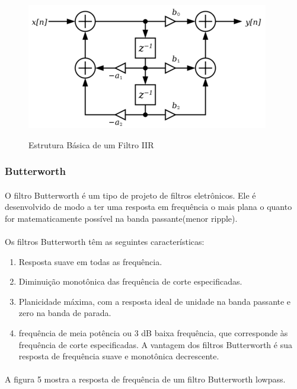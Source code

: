 \documentclass[12pt,fleqn]{article}
\begin{document}
\begin{figure}[!htb]
    \centering
    \includegraphics[scale=0.9]{fig/figura4.png}
    \label{figura:diagrama3}
    \caption{Estrutura Básica de um Filtro IIR}
\end{figure}

\subsubsection{Butterworth}
\paragraph{} O filtro Butterworth é um tipo de projeto de filtros eletrônicos. Ele é desenvolvido de modo a ter uma resposta em frequência o mais plana o quanto for matematicamente possível na banda passante(menor ripple).

\paragraph{} Os filtros Butterworth têm as seguintes características:
\begin{enumerate}
    \item Resposta suave em todas as frequência. 
    \item Diminuição monotônica das frequência de corte especificadas.
    \item Planicidade máxima, com a resposta ideal de unidade na banda passante e zero na banda de parada.
    \item frequência de meia potência ou 3 dB baixa frequência, que corresponde às frequência de corte especificadas. A vantagem dos filtros Butterworth é sua resposta de frequência suave e monotônica decrescente.
\end{enumerate}{}

\paragraph{} A figura 5 mostra a resposta de frequência de um filtro Butterworth lowpass.
\end{document}
